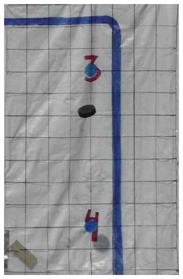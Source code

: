 \documentclass[a4paper,12pt]{article}
\begin{document}
\begin{figure}[ht]
\begin{subfigure}[t]{0.24\textwidth}
    \includegraphics[width=\linewidth]{photos/skott2.png}
  \end{subfigure}%
  \hspace*{\fill}
  \begin{subfigure}[t]{0.24\textwidth}
    \centering

\end{subfigure}
\end{figure}
\end{document}
